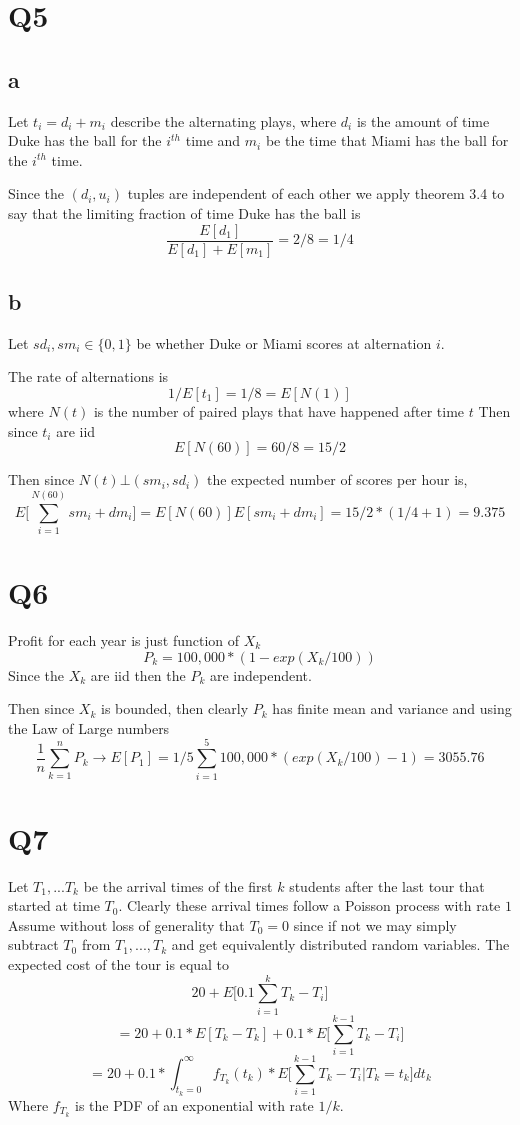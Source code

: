 \documentclass{article}
\begin{document}
\section*{Q5}
\subsection*{a}
Let $t_i = d_i + m_i$ describe the alternating plays, where $d_i$ is the amount of time Duke has the ball for the $i^{th}$ time and $m_i$ be the time that Miami has the ball for the $i^{th}$ time. 

Since the $(d_i,u_i)$ tuples are independent of each other we apply theorem 3.4 to say that the limiting fraction of time Duke has the ball is
$$
\frac{E[d_1]}{E[d_1] + E[m_1]} = 2 / 8 = 1/4
$$

\subsection*{b}


Let $sd_i, sm_i \in \{0,1\}$ be whether Duke or Miami scores at alternation $i$.

The rate of alternations is 
$$
1/E[t_1] = 1/8 = E[N(1)]
$$
where $N(t)$ is the number of paired plays that have happened after time $t$
Then since $t_i$ are iid
$$
E[N(60)] = 60/8 = 15/2
$$

Then since $N(t) \bot (sm_i, sd_i)$ the expected number of scores per hour is,
$$
E \bigg[\sum_{i=1}^{N(60)} sm_i + dm_i \bigg] = E[N(60)]E[sm_i + dm_i] = 15/2 * (1/4 + 1) = 9.375
$$

\section*{Q6}
Profit for each year is just function of $X_k$
$$
P_k = 100,000 *(1 - exp(X_k/100))
$$
Since the $X_k$ are iid then the $P_k$ are independent. 

Then since $X_k$ is bounded, then clearly $P_k$ has finite mean and variance and using the Law of Large numbers 
$$
\frac{1}{n} \sum_{k=1}^n P_k \to E[P_1] = 1/5 \sum_{i=1}^5 100,000 *( exp(X_k/100) -1) = 3055.76
$$

\section*{Q7}
Let $T_1, ... T_k$ be the arrival times of the first $k$ students after the last tour that started at time $T_0$. Clearly these arrival times follow a Poisson process with rate $1$ 
Assume without loss of generality that $T_0 = 0$ since if not we may simply subtract $T_0$ from $T_1, ... , T_k$ and get equivalently distributed random variables. 
The expected cost of the tour is equal to 
$$
20 + E\bigg[ 0.1 \sum_{i = 1}^k T_k - T_i \bigg]
$$
$$
= 20 + 0.1*E[T_k - T_k] + 0.1*E\bigg[ \sum_{i = 1}^{k-1} T_k - T_i \bigg]
$$
$$
= 20 + 0.1 * \int_{t_k = 0} ^ \infty f_{T_k}(t_k) * E\bigg[ \sum_{i = 1}^{k-1} T_k - T_i \bigg| T_k = t_k\bigg] dt_k
$$
Where $f_{T_k}$ is the PDF of an exponential with rate $1/k$.
\end{document}
